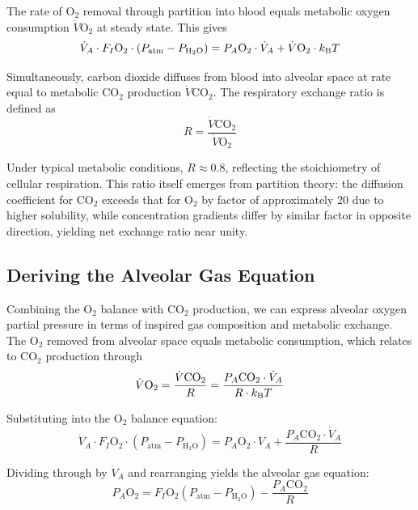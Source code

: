 The rate of O$_{2}$ removal through partition into blood equals metabolic oxygen consumption $\dot{V}\mathrm{O}_{2}$ at steady state. This gives
\begin{equation}
\dot{V}_{A} \cdot F_{I}\mathrm{O}_{2} \cdot (P_{\mathrm{atm}} - P_{\mathrm{H}_{2}\mathrm{O}}) = P_{A}\mathrm{O}_{2} \cdot \dot{V}_{A} + \dot{V}\mathrm{O}_{2} \cdot k_{\mathrm{B}} T
\end{equation}

Simultaneously, carbon dioxide diffuses from blood into alveolar space at rate equal to metabolic CO$_{2}$ production $\dot{V}\mathrm{CO}_{2}$. The respiratory exchange ratio is defined as
\begin{equation}
R = \frac{\dot{V}\mathrm{CO}_{2}}{\dot{V}\mathrm{O}_{2}}
\end{equation}

Under typical metabolic conditions, $R \approx 0.8$, reflecting the stoichiometry of cellular respiration. This ratio itself emerges from partition theory: the diffusion coefficient for CO$_{2}$ exceeds that for O$_{2}$ by factor of approximately 20 due to higher solubility, while concentration gradients differ by similar factor in opposite direction, yielding net exchange ratio near unity.

\subsection{Deriving the Alveolar Gas Equation}

Combining the O$_{2}$ balance with CO$_{2}$ production, we can express alveolar oxygen partial pressure in terms of inspired gas composition and metabolic exchange. The O$_{2}$ removed from alveolar space equals metabolic consumption, which relates to CO$_{2}$ production through
\begin{equation}
\dot{V}\mathrm{O}_{2} = \frac{\dot{V}\mathrm{CO}_{2}}{R} = \frac{P_{A}\mathrm{CO}_{2} \cdot \dot{V}_{A}}{R \cdot k_{\mathrm{B}} T}
\end{equation}

Substituting into the O$_{2}$ balance equation:
\begin{equation}
\dot{V}_{A} \cdot F_{I}\mathrm{O}_{2} \cdot (P_{\mathrm{atm}} - P_{\mathrm{H}_{2}\mathrm{O}}) = P_{A}\mathrm{O}_{2} \cdot \dot{V}_{A} + \frac{P_{A}\mathrm{CO}_{2} \cdot \dot{V}_{A}}{R}
\end{equation}

Dividing through by $\dot{V}_{A}$ and rearranging yields the alveolar gas equation:
\begin{equation}
\boxed{P_{A}\mathrm{O}_{2} = F_{I}\mathrm{O}_{2}(P_{\mathrm{atm}} - P_{\mathrm{H}_{2}\mathrm{O}}) - \frac{P_{A}\mathrm{CO}_{2}}{R}}
\label{eq:alveolar_gas}
\end{equation}

